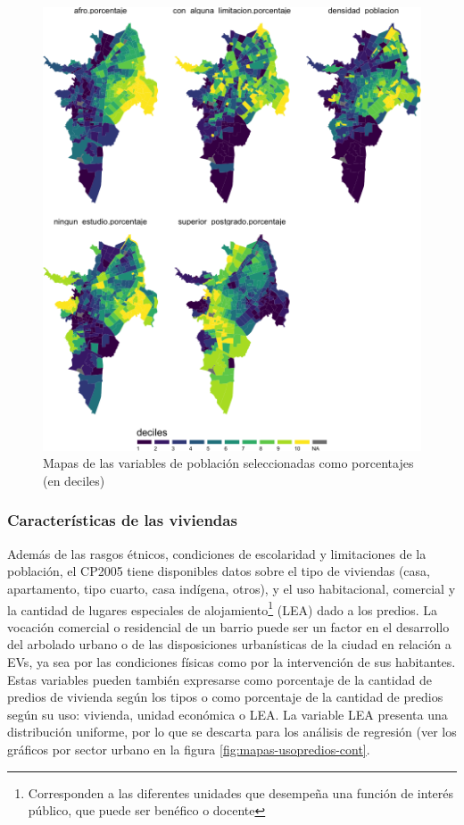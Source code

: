 \documentclass[12pt,a4paper,openany]{book}
\let\rmarkdownfootnote\footnote%
\def\footnote{\protect\rmarkdownfootnote}
\theoremstyle{definition}
\theoremstyle{definition}
\theoremstyle{definition}
\theoremstyle{remark}
\begin{document}
\begin{figure}[H]

{\centering \includegraphics[width=0.9\linewidth]{tesis-unigis_files/figure-latex/mapas-poblacion-mod-deciles-1} 

}

\caption{Mapas de las variables de población seleccionadas como porcentajes (en deciles)}\label{fig:mapas-poblacion-mod-deciles}
\end{figure}

\subsubsection{Características de las
viviendas}\label{caracteruxedsticas-de-las-viviendas}

Además de las rasgos étnicos, condiciones de escolaridad y limitaciones
de la población, el CP2005 tiene disponibles datos sobre el tipo de
viviendas (casa, apartamento, tipo cuarto, casa indígena, otros), y el
uso habitacional, comercial y la cantidad de lugares especiales de
alojamiento\footnote{Corresponden a las diferentes unidades que
  desempeña una función de interés público, que puede ser benéfico o
  docente} (LEA) dado a los predios. La vocación comercial o residencial
de un barrio puede ser un factor en el desarrollo del arbolado urbano o
de las disposiciones urbanísticas de la ciudad en relación a EVs, ya sea
por las condiciones físicas como por la intervención de sus habitantes.
Estas variables pueden también expresarse como porcentaje de la cantidad
de predios de vivienda según los tipos o como porcentaje de la cantidad
de predios según su uso: vivienda, unidad económica o LEA. La variable
LEA presenta una distribución uniforme, por lo que se descarta para los
análisis de regresión (ver los gráficos por sector urbano en la figura
\ref{fig:mapas-usopredios-cont}.
\end{document}
